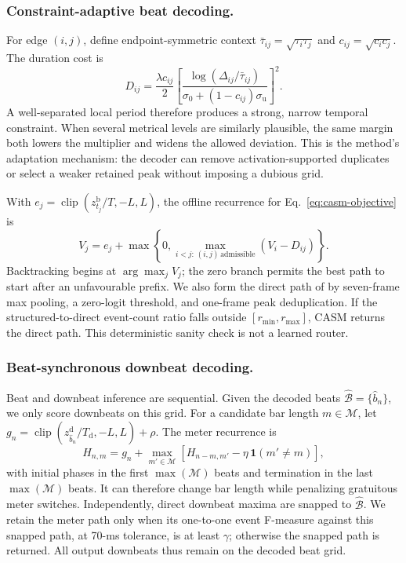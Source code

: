\documentclass{article}
\begin{document}
\subsubsection{Constraint-adaptive beat decoding.}
For edge $(i,j)$, define endpoint-symmetric context
$\bar\tau_{ij}=\sqrt{\tau_i\tau_j}$ and
$c_{ij}=\sqrt{c_i c_j}$.  The duration cost is
\begin{equation}
D_{ij}=\frac{\lambda c_{ij}}{2}
\left[
\frac{\log(\Delta_{ij}/\bar\tau_{ij})}
{\sigma_0+(1-c_{ij})\sigma_{\mathrm u}}
\right]^2.
\label{eq:casm-duration}
\end{equation}
A well-separated local period therefore produces a strong, narrow temporal
constraint.  When several metrical levels are similarly plausible, the same
margin both lowers the multiplier and widens the allowed deviation.  This is
the method's adaptation mechanism: the decoder can remove activation-supported
duplicates or select a weaker retained peak without imposing a dubious grid.

With $e_j=\operatorname{clip}(z^{\mathrm b}_{t_j}/T,-L,L)$, the offline
recurrence for Eq.~\eqref{eq:casm-objective} is
\begin{equation}
V_j=e_j+\max\!\left\{0,
\max_{i<j:\,(i,j)\,\mathrm{admissible}}
\left(V_i-D_{ij}\right)\right\}.
\label{eq:casm-dp}
\end{equation}
Backtracking begins at $\arg\max_j V_j$; the zero branch permits the best path
to start after an unfavourable prefix.  We also form the direct path of
\cite{foscarin2024beat} by seven-frame max pooling, a zero-logit threshold, and
one-frame peak deduplication.  If the structured-to-direct event-count ratio
falls outside $[r_{\min},r_{\max}]$, CASM returns the direct path.  This
deterministic sanity check is not a learned router.

\subsubsection{Beat-synchronous downbeat decoding.}
Beat and downbeat inference are sequential.  Given the decoded beats
$\widehat{\mathcal B}=\{\widehat b_n\}$, we only score downbeats on this grid.
For a candidate bar length $m\in\mathcal M$, let
$g_n=\operatorname{clip}(z^{\mathrm d}_{\widehat b_n}/T_{\mathrm d},-L,L)
+\rho$.  The meter recurrence is
\begin{equation}
H_{n,m}=g_n+\max_{m'\in\mathcal M}
\left[H_{n-m,m'}-\eta\,\mathbf 1(m'\neq m)\right],
\label{eq:casm-meter}
\end{equation}
with initial phases in the first $\max(\mathcal M)$ beats and termination in
the last $\max(\mathcal M)$ beats.  It can therefore change bar length while
penalizing gratuitous meter switches.  Independently, direct downbeat maxima
are snapped to $\widehat{\mathcal B}$.  We retain the meter path only when its
one-to-one event F-measure against this snapped path, at 70-ms tolerance, is at
least $\gamma$; otherwise the snapped path is returned.  All output downbeats
thus remain on the decoded beat grid.
\end{document}
